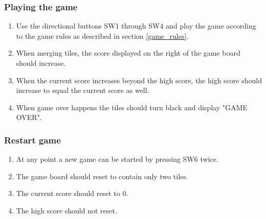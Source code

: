 \subsubsection{Playing the game}
\begin{enumerate}
    \item   Use the directional buttons SW1 through SW4 and play the game according to the game rules as described in section \ref{game_rules}.
    \item   When merging tiles, the score displayed on the right of the game board should increase.
    \item   When the current score increases beyond the high score, the high score should increase to equal the current score as well.
    \item   When game over happens the tiles should turn black and display "GAME OVER".
\end{enumerate}

\subsubsection{Restart game}
\begin{enumerate}
    \item   At any point a new game can be started by pressing SW6 twice.
    \item   The game board should reset to contain only two tiles.
    \item   The current score should reset to 0.
    \item   The high score should not reset.
\end{enumerate}
